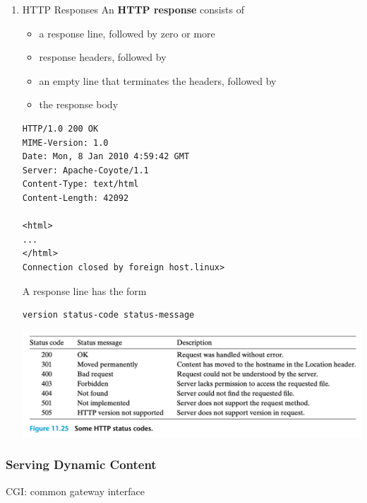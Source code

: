 \documentclass[11pt]{article}
\begin{document}
\begin{enumerate}
\item HTTP Responses
\label{sec:org1419204}
An \textbf{HTTP response} consists of\\
\begin{itemize}
\item a response line, followed by zero or more\\
\item response headers, followed by\\
\item an empty line that terminates the headers, followed by\\
\item the response body\\
\end{itemize}

\begin{verbatim}
HTTP/1.0 200 OK
MIME-Version: 1.0
Date: Mon, 8 Jan 2010 4:59:42 GMT
Server: Apache-Coyote/1.1
Content-Type: text/html
Content-Length: 42092

<html>
...
</html>
Connection closed by foreign host.linux>
\end{verbatim}

A response line has the form\\
\begin{verbatim}
version status-code status-message
\end{verbatim}

\begin{center}
\includegraphics[width=.9\linewidth]{pics/figure11.25-some-http-status-code.png}
\end{center}
\end{enumerate}

\subsubsection{Serving Dynamic Content}
\label{sec:org9ec614f}
CGI: common gateway interface\\
\end{document}
